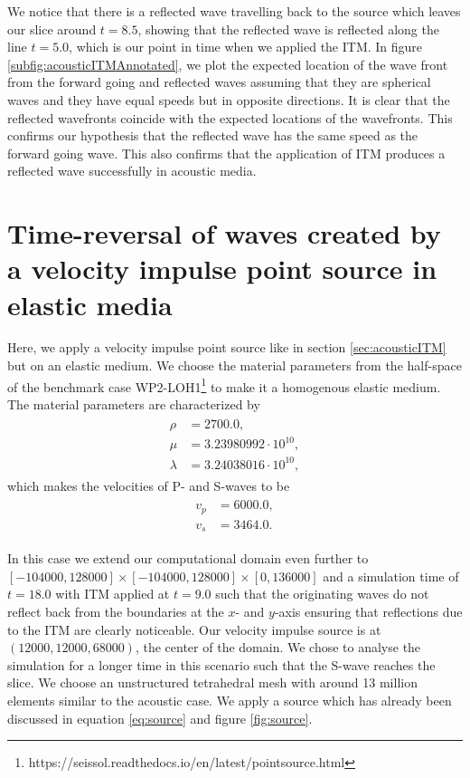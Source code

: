 We notice that there is a reflected wave travelling back to the source which leaves our slice around $t=8.5$, showing that the reflected wave
is reflected along the line $t=5.0$, which is our point in time when we applied the \ac{ITM}. In figure \ref{subfig:acousticITMAnnotated}, we plot the expected
location of the wave front from the forward going and reflected waves assuming that they are spherical waves and they have equal speeds but in opposite directions. 
It is clear that the reflected wavefronts coincide with the expected locations of the wavefronts. This confirms our hypothesis that the reflected wave has the same speed
as the forward going wave. This also confirms that the application of \ac{ITM} produces a reflected wave successfully in acoustic media.

\section{Time-reversal of waves created by a velocity impulse point source in elastic media} \label{sec:elasticITM}
Here, we apply a velocity impulse point source like in section \ref{sec:acousticITM} but on an elastic medium. We choose the material parameters from the half-space of the 
benchmark case WP2-LOH1\footnote[1]{https://seissol.readthedocs.io/en/latest/pointsource.html} to make it a homogenous elastic medium. The material parameters 
are characterized by
\begin{align}
    \begin{split}
        \rho &=    2700.0 ,\\
        \mu &=     3.23980992 \cdot 10^{10} ,\\
        \lambda &= 3.24038016 \cdot 10^{10} ,
    \end{split}
\end{align}
which makes the velocities of P- and S-waves to be
\begin{align}
    \begin{split}
        v_p &= 6000.0 ,\\
        v_s &= 3464.0 .
    \end{split}
\end{align}

In this case we extend our computational domain even further to $\left[-104000,128000\right] \times \left[-104000,128000\right] \times \left[0,136000\right]$ and a simulation time of $t=18.0$ with \ac{ITM} applied at $t=9.0$
such that the originating waves do not reflect back from the boundaries at the $x$- and $y$-axis ensuring that reflections due to the \ac{ITM} are clearly noticeable.
Our velocity impulse source is at $\left(12000,12000,68000\right)$, the center of the domain.
We chose to analyse the simulation for a longer time in this scenario such that the S-wave reaches the slice. We choose an unstructured tetrahedral mesh with around 13 million elements similar to the acoustic case. 
We apply a source which has already been discussed in equation \ref{eq:source} and figure \ref{fig:source}.

